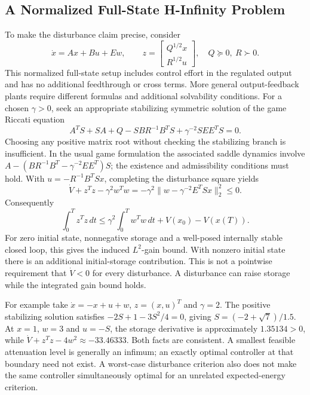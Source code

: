 \subsection{A Normalized Full-State H-Infinity Problem}

To make the disturbance claim precise, consider
\begin{equation}
\dot x=Ax+Bu+Ew,\qquad
z=\begin{bmatrix}Q^{1/2}x\\R^{1/2}u\end{bmatrix},
\quad Q\succeq0,\ R\succ0.
\end{equation}
This normalized full-state setup includes control effort in the regulated output and has no additional feedthrough or cross terms. More general output-feedback plants require different formulas and additional solvability conditions. For a chosen $\gamma>0$, seek an appropriate stabilizing symmetric solution of the game Riccati equation
\begin{equation}
A^TS+SA+Q-SBR^{-1}B^TS+
\gamma^{-2}SEE^TS=0.
\end{equation}
Choosing any positive matrix root without checking the stabilizing branch is insufficient. In the usual game formulation the associated saddle dynamics involve $A-(BR^{-1}B^T-\gamma^{-2}EE^T)S$; the existence and admissibility conditions must hold. With $u=-R^{-1}B^TSx$, completing the disturbance square yields
\begin{equation}
\dot V+z^Tz-\gamma^2w^Tw
=-\gamma^2\|w-\gamma^{-2}E^TSx\|_2^2\le0.
\end{equation}
Consequently
\begin{equation}
\int_0^T z^Tz\,dt\le
\gamma^2\int_0^T w^Tw\,dt+V(x_0)-V(x(T)).
\end{equation}
For zero initial state, nonnegative storage and a well-posed internally stable closed loop, this gives the induced $L^2$-gain bound. With nonzero initial state there is an additional initial-storage contribution. This is not a pointwise requirement that $\dot V<0$ for every disturbance. A disturbance can raise storage while the integrated gain bound holds.

For example take $\dot x=-x+u+w$, $z=(x,u)^T$ and $\gamma=2$. The positive stabilizing solution satisfies $-2S+1-3S^2/4=0$, giving $S=(-2+\sqrt7)/1.5$. At $x=1$, $w=3$ and $u=-S$, the storage derivative is approximately $1.35134>0$, while $\dot V+z^Tz-4w^2\approx-33.46333$. Both facts are consistent. A smallest feasible attenuation level is generally an infimum; an exactly optimal controller at that boundary need not exist. A worst-case disturbance criterion also does not make the same controller simultaneously optimal for an unrelated expected-energy criterion.

